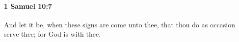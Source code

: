 
		\paragraph{1 Samuel 10:7} %
			\label{1SAMUEL-10-7}

			And let it be, when these signs are come unto thee, that thou do as occasion serve thee; for God is with thee.


